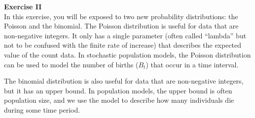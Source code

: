 \documentclass[12pt]{article}\usepackage[]{graphicx}\usepackage[]{color}
\begin{document}




\newpage


{\bf Exercise II \\ }
In this exercise, you will be exposed to two new probability
distributions: the Poisson and the binomial. The Poisson distribution
is useful for data that are non-negative integers. It only has
a single parameter (often called ``lambda'' but not to be confused with the
finite rate of increase) that describes the expected value of the
count data. In stochastic population models, the Poisson distribution
can be used to model the number of births ($B_t$) that occur in a time
interval. 

The binomial distribution is also useful for data that are
non-negative integers, but it has an upper bound. In population
models, the upper bound is often population size, and we use the model
to describe how many individuals die during some time period.
\end{document}

